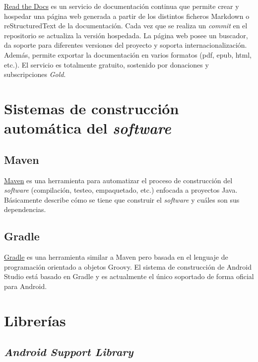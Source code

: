 \href{https://readthedocs.org/}{Read the Docs} es un servicio de documentación continua que permite crear
y hospedar una página web generada a partir de los distintos ficheros
Markdown o reStructuredText de la documentación. Cada vez que se realiza
un \emph{commit} en el repositorio se actualiza la versión hospedada. La
página web posee un buscador, da soporte para diferentes versiones del
proyecto y soporta internacionalización. Además, permite exportar la
documentación en varios formatos (pdf, epub, html, etc.). El servicio es
totalmente gratuito, sostenido por donaciones y subscripciones
\emph{Gold}.

\section{Sistemas de construcción automática del
\emph{software}}\label{sistemas-de-construccion-automuxe1tica-del-software}

\subsection{Maven}\label{maven}

\href{https://maven.apache.org/}{Maven} es una herramienta para
automatizar el proceso de construcción del \emph{software} (compilación,
testeo, empaquetado, etc.) enfocada a proyectos Java. Básicamente
describe cómo se tiene que construir el \emph{software} y cuáles son sus
dependencias.

\subsection{Gradle}\label{gradle}

\href{https://gradle.org/}{Gradle} es una herramienta similar a Maven
pero basada en el lenguaje de programación orientado a objetos Groovy.
El sistema de construcción de Android Studio está basado en Gradle y es
actualmente el único soportado de forma oficial para Android.

\section{Librerías}\label{libreruxedas}

\subsection{\texorpdfstring{\emph{Android Support
Library}}{Android Support Library}}\label{android-support-library}


